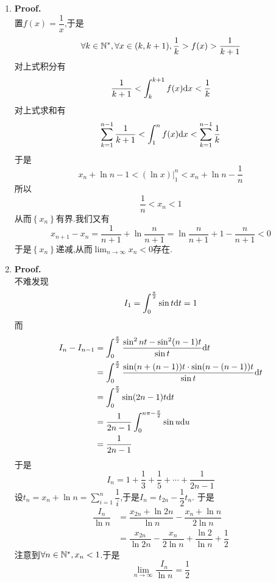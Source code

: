 \documentclass{ctexart}
\begin{document}
\begin{solution}
    \begin{enumerate}[label=\textbf{(\arabic*)}]
        \item \textbf{Proof.}\\
            置$f(x)=\dfrac{1}{x}$,于是$$\forall k\in\mathbb{N}^*,\forall x\in(k,k+1),\dfrac{1}{k}>f(x)>\dfrac{1}{k+1}$$
            对上式积分有$$\dfrac{1}{k+1}<\int_{k}^{k+1}f(x)\mathrm{d} x<\dfrac{1}{k}$$
            对上式求和有$$\sum_{k=1}^{n-1}\dfrac{1}{k+1}<\int_1^nf(x)\mathrm{d} x<\sum_{k=1}^{n-1}\dfrac{1}{k}$$
            于是$$x_n+\ln n-1<\left.(\ln x)\right|_1^n<x_n+\ln n-\dfrac{1}{n}$$
            所以$$\dfrac{1}{n}<x_n<1$$
            从而$\left\{x_n\right\}$有界.我们又有
            $$x_{n+1}-x_n=\dfrac{1}{n+1}+\ln\dfrac{n}{n+1}=\ln\dfrac{n}{n+1}+1-\dfrac{n}{n+1}<0$$
            于是$\left\{x_n\right\}$递减,从而$\displaystyle\lim_{n\to\infty}x_n<0$存在.
        \item \textbf{Proof.}\\
            不难发现$$I_1=\int_0^{\frac{\pi}{2}}\sin t\mathrm{d} t=1$$
            而
            $$\begin{aligned}
                I_n-I_{n-1}
                &= \int_0^{\frac{\pi}{2}}\dfrac{\sin^2nt-\sin^2(n-1)t}{\sin t}\mathrm{d} t \\
                &= \int_0^{\frac{\pi}{2}}\dfrac{\sin(n+(n-1))t\cdot\sin(n-(n-1))t}{\sin t}\mathrm{d} t \\
                &= \int_0^{\frac{\pi}{2}}\sin(2n-1)t\mathrm{d} t \\
                &= \dfrac{1}{2n-1}\int_0^{n\pi-\frac{\pi}{2}}\sin u\mathrm{d} u \\
                &= \dfrac{1}{2n-1}
            \end{aligned}$$
            于是$$I_n=1+\dfrac{1}{3}+\dfrac{1}{5}+\cdots+\dfrac{1}{2n-1}$$
            设$\displaystyle t_n=x_n+\ln n=\sum_{i=1}^n\dfrac{1}{i}$,于是$I_n=t_{2n}-\dfrac{1}{2}t_n$.
            于是$$\begin{aligned}
                \dfrac{I_n}{\ln n}
                &= \dfrac{x_{2n}+\ln2n}{\ln n}-\dfrac{x_n+\ln n}{2\ln n} \\
                &= \dfrac{x_{2n}}{\ln2n}-\dfrac{x_n}{2\ln n}+\dfrac{\ln 2}{\ln n}+\dfrac{1}{2}
            \end{aligned}$$
            注意到$\forall n\in\mathbb{N}^*,x_n<1$.于是$$\lim_{n\to\infty}\dfrac{I_n}{\ln n}=\dfrac{1}{2}$$
    \end{enumerate}
\end{solution}
\end{document}
